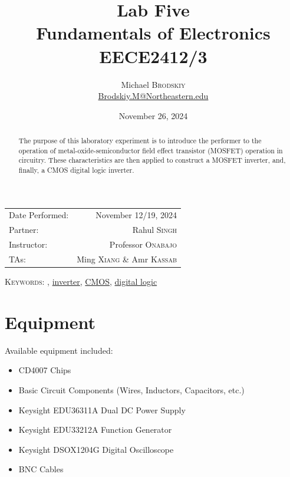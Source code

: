 \documentclass[
	letterpaper, %
	10pt, %
]{CSUniSchoolLabReport}
\title{Lab Five\\ Fundamentals of Electronics \\ EECE2412/3} %
\author{Michael \textsc{Brodskiy}\\ \small \href{mailto:Brodskiy.M@Northeastern.edu}{Brodskiy.M@Northeastern.edu}}
\date{November 26, 2024} %
\begin{document}
\maketitle %

\begin{center}
	\begin{tabular}{l r}
        Date Performed: & November 12/19, 2024 \\ %
        Partner: & Rahul \textsc{Singh} \\ %
		Instructor: & Professor \textsc{Onabajo} \\ %
        TAs: & Ming \textsc{Xiang} \& Amr \textsc{Kassab} \\ %
	\end{tabular}
\end{center}

\newpage

\begin{abstract}

  The purpose of this laboratory experiment is to introduce the performer to the operation of metal-oxide-semiconductor field effect transistor (MOSFET) operation in circuitry. These characteristics are then applied to construct a MOSFET inverter, and, finally, a CMOS digital logic inverter.

\end{abstract}

\begin{flushleft}

  \textsc{Keywords:} , \underline{inverter}, \underline{CMOS}, \underline{digital logic}

\end{flushleft}

\newpage

\tableofcontents
\listoffigures

\newpage

\section{Equipment}

Available equipment included:\\

\begin{itemize}

  \item CD4007 Chips

  \item Basic Circuit Components (Wires, Inductors, Capacitors, etc.)

  \item Keysight EDU36311A Dual DC Power Supply

  \item Keysight EDU33212A Function Generator

  \item Keysight DSOX1204G Digital Oscilloscope

  \item BNC Cables

\end{itemize}
\end{document}
